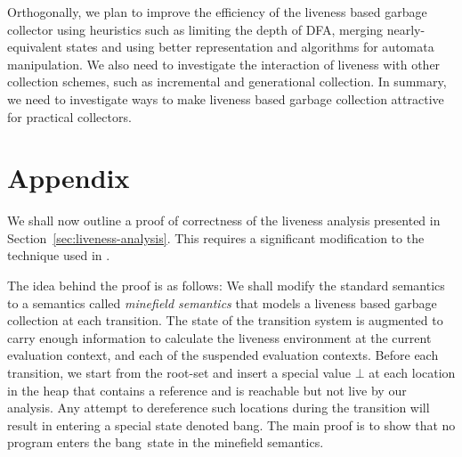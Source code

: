 \documentclass[9pt]{sigplanconf}
\newcommand{\cblue}[1]{{\color{blue}{#1}}}
\newcommand{\bang}{\mbox{\sc bang}}
\begin{document}
  Orthogonally,  we plan  to improve  the efficiency  of the  liveness
  based garbage collector using heuristics  such as limiting the depth
  of  DFA,   merging  nearly-equivalent   states  and   using  better
  representation  and algorithms  for automata  manipulation. We  also
  need  to   investigate  the  interaction  of   liveness  with  other
  collection schemes, such as incremental and generational collection.
  In  summary, we  need to  investigate  ways to  make liveness  based
  garbage collection attractive for practical collectors.  




{}


\pagebreak
\section{Appendix}

We shall now  outline a proof of correctness  of the liveness analysis
presented  in  Section~\ref{sec:liveness-analysis}.   This requires  a
significant modification  to the technique  used in \cite{asati14lgc}.
\cblue{Good points to  make in the main text, right  in the small step
  semantics  section: Note  that the  state of  the  transition system
  consists of the current evaluation context, given by $\rho$ and $e$,
  and  the suspended evaluation  contexts recorded  in the  stack $S$.
  The heap $H$  is common to all contexts.}

The idea behind the proof is  as follows: We shall modify the standard
semantics to a semantics  called {\em minefield semantics} that models
a liveness based garbage collection  at each transition.  The state of
the  transition system  is augmented  to carry  enough  information to
calculate the liveness environment  at the current evaluation context,
and  each   of  the   suspended  evaluation  contexts.    Before  each
transition,  we start  from the  root-set and  insert a  special value
$\bot$ at each  location in the heap that contains  a reference and is
reachable but  not live by  our analysis.  Any attempt  to dereference
such locations during the transition will result in entering a special
state denoted \bang.  The main proof is to show that no program enters
the \bang\ state in the minefield semantics.
 
\end{document}
